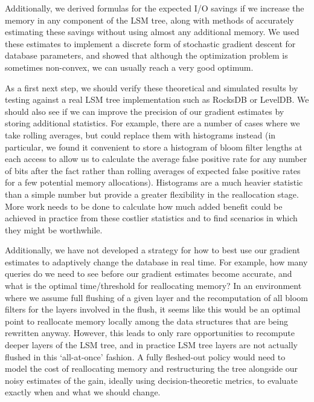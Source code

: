 \documentclass{sig-alternate-05-2015}
\begin{document}
Additionally, we derived formulas for the expected I/O savings if we increase
the memory in any component of the LSM tree, along with methods of accurately
estimating these savings without using almost any additional memory. We used
these estimates to implement a discrete form of stochastic gradient descent for
database parameters, and showed that although the optimization problem is
sometimes non-convex, we can usually reach a very good optimum.

As a first next step, we should verify these theoretical and simulated results
by testing against a real LSM tree implementation such as RocksDB or LevelDB.
We should also see if we can improve the precision of our gradient estimates by
storing additional statistics. For example, there are a number of cases where
we take rolling averages, but could replace them with histograms instead (in
particular, we found it convenient to store a histogram of bloom filter lengths
at each access to allow us to calculate the average false positive rate for any
number of bits after the fact rather than rolling averages of expected false
positive rates for a few potential memory allocations). Histograms are a much
heavier statistic than a simple number but provide a greater flexibility in the
reallocation stage. More work needs to be done to calculate how much added
benefit could be achieved in practice from these costlier statistics and to
find scenarios in which they might be worthwhile.

Additionally, we have not developed a strategy for how to best use our gradient
estimates to adaptively change the database in real time.  For example, how
many queries do we need to see before our gradient estimates become accurate,
and what is the optimal time/threshold for reallocating memory? In an
environment where we assume full flushing of a given layer and the
recomputation of all bloom filters for the layers involved in the flush, it
seems like this would be an optimal point to reallocate memory locally among
the data structures that are being rewritten anyway. However, this leads to
only rare opportunities to recompute deeper layers of the LSM tree, and in
practice LSM tree layers are not actually flushed in this `all-at-once'
fashion. A fully fleshed-out policy would need to model the cost of
reallocating memory and restructuring the tree alongside our noisy estimates of
the gain, ideally using decision-theoretic metrics, to evaluate exactly when
and what we should change.
\end{document}
